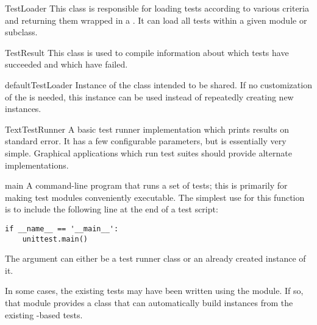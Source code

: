 \begin{classdesc}{TestLoader}{}
  This class is responsible for loading tests according to various
  criteria and returning them wrapped in a .
  It can load all tests within a given module or 
  subclass.
\end{classdesc}

\begin{classdesc}{TestResult}{}
  This class is used to compile information about which tests have succeeded
  and which have failed.
\end{classdesc}

\begin{datadesc}{defaultTestLoader}
  Instance of the  class intended to be shared.  If no
  customization of the  is needed, this instance can
  be used instead of repeatedly creating new instances.
\end{datadesc}

\begin{classdesc}{TextTestRunner}{}
  A basic test runner implementation which prints results on standard
  error.  It has a few configurable parameters, but is essentially
  very simple.  Graphical applications which run test suites should
  provide alternate implementations.
\end{classdesc}

\begin{funcdesc}{main}{}
  A command-line program that runs a set of tests; this is primarily
  for making test modules conveniently executable.  The simplest use
  for this function is to include the following line at the end of a
  test script:

\begin{verbatim}
if __name__ == '__main__':
    unittest.main()
\end{verbatim}

  The  argument can either be a test runner class or
  an already created instance of it.
\end{funcdesc}

In some cases, the existing tests may have been written using the
 module.  If so, that module provides a 
 class that can automatically build
 instances from the existing
-based tests.


